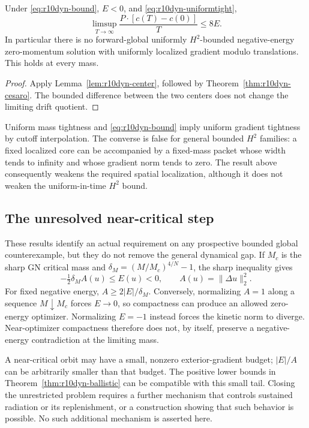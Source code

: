 \begin{corollary}
\label{cor:r10dyn-uniform}
Under \eqref{eq:r10dyn-bound}, $E<0$, and
\eqref{eq:r10dyn-uniformtight},
\[
 \limsup_{T\to\infty}\frac{P\cdot[c(T)-c(0)]}{T}\le8E.
\]
In particular there is no forward-global uniformly $H^2$-bounded
negative-energy zero-momentum solution with uniformly localized gradient
modulo translations. This holds at every mass.
\end{corollary}
\begin{proof}
Apply Lemma~\ref{lem:r10dyn-center}, followed by
Theorem~\ref{thm:r10dyn-cesaro}. The bounded difference between the two
centers does not change the limiting drift quotient.
\end{proof}

Uniform mass tightness and \eqref{eq:r10dyn-bound} imply uniform gradient
tightness by cutoff interpolation. The converse is false for general
bounded $H^2$ families: a fixed localized core can be accompanied by a
fixed-mass packet whose width tends to infinity and whose gradient norm
tends to zero. The result above consequently weakens the required spatial
localization, although it does not weaken the uniform-in-time $H^2$ bound.

\subsection{The unresolved near-critical step}

These results identify an actual requirement on any prospective bounded
global counterexample, but they do not remove the general dynamical gap.
If $M_c$ is the sharp GN critical mass and
$\delta_M=(M/M_c)^{4/N}-1$, the sharp inequality gives
\[
 -\tfrac12\delta_M A(u)\le E(u)<0,\qquad
 A(u)=\|\Delta u\|_2^2.
\]
For fixed negative energy, $A\ge2|E|/\delta_M$. Conversely, normalizing
$A=1$ along a sequence $M\downarrow M_c$ forces $E\to0$, so compactness
can produce an allowed zero-energy optimizer. Normalizing $E=-1$ instead
forces the kinetic norm to diverge. Near-optimizer compactness therefore
does not, by itself, preserve a negative-energy contradiction at the
limiting mass.

A near-critical orbit may have a small, nonzero exterior-gradient budget;
$|E|/A$ can be arbitrarily smaller than that budget. The positive lower
bounds in Theorem~\ref{thm:r10dyn-ballistic} can be compatible with this
small tail. Closing the unrestricted problem requires a further mechanism
that controls sustained radiation or its replenishment, or a construction
showing that such behavior is possible. No such additional mechanism is
asserted here.
